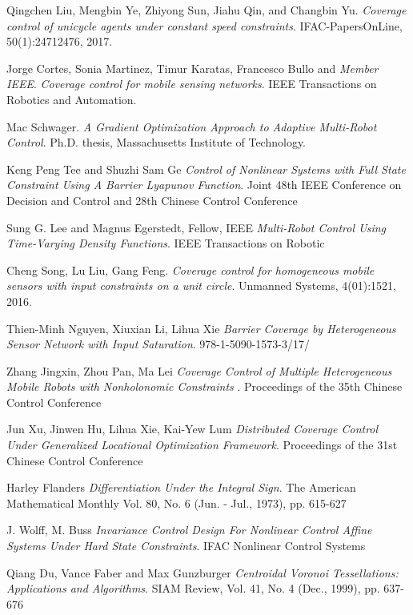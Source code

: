 \begin{thebibliography}{9}
Qingchen Liu, Mengbin Ye, Zhiyong Sun, Jiahu Qin, and Changbin Yu.
\textit{Coverage control of unicycle agents under constant speed constraints}. 
IFAC-PapersOnLine, 50(1):2471{2476, 2017}.

Jorge Cortes, Sonia Martinez, Timur Karatas, Francesco Bullo and \textit{Member IEEE}.
\textit{Coverage control for mobile sensing networks}. 
IEEE Transactions on Robotics and Automation.

Mac Schwager.
\textit{A Gradient Optimization Approach to Adaptive Multi-Robot Control}. 
Ph.D. thesis, Massachusetts Institute of Technology.

Keng Peng Tee and Shuzhi Sam Ge
\textit{Control of Nonlinear Systems with Full State Constraint Using A
	Barrier Lyapunov Function}. 
Joint 48th IEEE Conference on Decision and Control and 28th Chinese Control Conference

Sung G. Lee and Magnus Egerstedt, Fellow, IEEE
\textit{Multi-Robot Control Using Time-Varying Density Functions}. 
IEEE Transactions on Robotic

Cheng Song, Lu Liu, Gang Feng.
\textit{Coverage control for homogeneous mobile sensors with input constraints on a unit circle}. 
Unmanned Systems, 4(01):15{21, 2016}.

Thien-Minh Nguyen, Xiuxian Li, Lihua Xie
\textit{Barrier Coverage by Heterogeneous Sensor Network with Input Saturation}. 
978-1-5090-1573-3/17/

Zhang Jingxin, Zhou Pan, Ma Lei
\textit{Coverage Control of Multiple Heterogeneous Mobile Robots with Nonholonomic Constraints }. 
Proceedings of the 35th Chinese Control Conference

Jun Xu, Jinwen Hu, Lihua Xie, Kai-Yew Lum
\textit{Distributed Coverage Control Under Generalized Locational Optimization Framework}. 
Proceedings of the 31st Chinese Control Conference

Harley Flanders
\textit{Differentiation Under the Integral Sign}. 
The American Mathematical Monthly Vol. 80, No. 6 (Jun. - Jul., 1973), pp. 615-627

J. Wolff, M. Buss
\textit{Invariance Control Design For Nonlinear Control Affine Systems Under Hard State Constraints}. 
IFAC Nonlinear Control Systems

Qiang Du, Vance Faber and Max Gunzburger
\textit{Centroidal Voronoi Tessellations: Applications and Algorithms}. 
SIAM Review, Vol. 41, No. 4 (Dec., 1999), pp. 637-676


\end{thebibliography}
